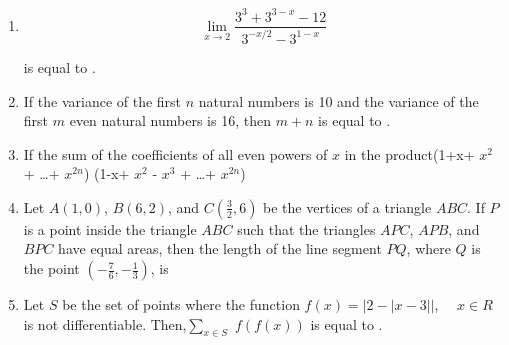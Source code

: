 \documentclass{article}
\begin{document}
\begin{enumerate}
\item
\[
\lim_{x \to 2} \frac{3^3 + 3^{3-x} - 12}{3^{-x/2} - 3^{1-x}}
\]

is equal to \underline{\hspace{2cm}}.

\item If the variance of the first $n$ natural numbers is 10 and the variance of the first $m$ even natural numbers is 16, then $m+n$ is equal to \underline{\hspace{2cm}}.

\item If the sum of the coefficients of all even powers of $x$ in the product(1+x+ $x^2$ + \dots + $x^{2n}$) (1-x+ $x^2$ - $x^3$ + \dots + $x^{2n}$)

\item Let $A(1, 0)$, $B(6, 2)$, and $C(\frac{3}{2},6)$ be the vertices of a triangle $ABC$. If $P$ is a point inside the triangle $ABC$ such that the triangles $APC$, $APB$, and $BPC$ have equal areas, then the length of the line segment $PQ$, where $Q$ is the point $(-\frac{7}{6}, -\frac{1}{3})$, is \underline{\hspace{2cm}}


\item Let $S$ be the set of points where the function
$f(x) = |2 - |x - 3||$, $\quad x \in {R}$ is not differentiable. Then,$\sum_{x \in S}$ $f(f(x))$
is equal to \underline{\hspace{1cm}}.



\end{enumerate}
\end{document}
